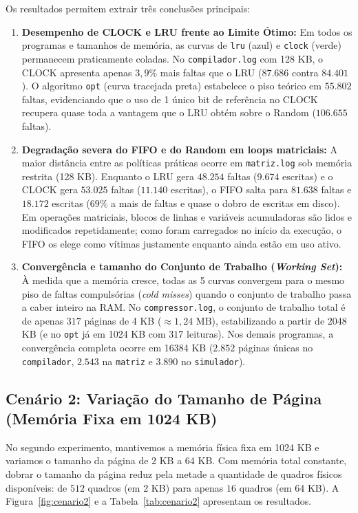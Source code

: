\documentclass[12pt,a4paper]{article}
\begin{document}
Os resultados permitem extrair três conclusões principais:
\begin{enumerate}
    \item \textbf{Desempenho de CLOCK e LRU frente ao Limite Ótimo:} Em todos os programas e tamanhos de memória, as curvas de \texttt{lru} (azul) e \texttt{clock} (verde) permanecem praticamente coladas. No \texttt{compilador.log} com 128 KB, o CLOCK apresenta apenas $3,9\%$ mais faltas que o LRU ($87.686$ contra $84.401$). O algoritmo \texttt{opt} (curva tracejada preta) estabelece o piso teórico em $55.802$ faltas, evidenciando que o uso de 1 único bit de referência no CLOCK recupera quase toda a vantagem que o LRU obtém sobre o Random ($106.655$ faltas).
    \item \textbf{Degradação severa do FIFO e do Random em loops matriciais:} A maior distância entre as políticas práticas ocorre em \texttt{matriz.log} sob memória restrita (128 KB). Enquanto o LRU gera $48.254$ faltas ($9.674$ escritas) e o CLOCK gera $53.025$ faltas ($11.140$ escritas), o FIFO salta para $81.638$ faltas e $18.172$ escritas ($69\%$ a mais de faltas e quase o dobro de escritas em disco). Em operações matriciais, blocos de linhas e variáveis acumuladoras são lidos e modificados repetidamente; como foram carregados no início da execução, o FIFO os elege como vítimas justamente enquanto ainda estão em uso ativo.
    \item \textbf{Convergência e tamanho do Conjunto de Trabalho (\textit{Working Set}):} À medida que a memória cresce, todas as 5 curvas convergem para o mesmo piso de faltas compulsórias (\textit{cold misses}) quando o conjunto de trabalho passa a caber inteiro na RAM. No \texttt{compressor.log}, o conjunto de trabalho total é de apenas $317$ páginas de 4 KB ($\approx 1,24\text{ MB}$), estabilizando a partir de 2048 KB (e no \texttt{opt} já em 1024 KB com $317$ leituras). Nos demais programas, a convergência completa ocorre em 16384 KB ($2.852$ páginas únicas no \texttt{compilador}, $2.543$ na \texttt{matriz} e $3.890$ no \texttt{simulador}).
\end{enumerate}

\subsection{Cenário 2: Variação do Tamanho de Página (Memória Fixa em 1024 KB)}

No segundo experimento, mantivemos a memória física fixa em 1024 KB e variamos o tamanho da página de 2 KB a 64 KB. Com memória total constante, dobrar o tamanho da página reduz pela metade a quantidade de quadros físicos disponíveis: de $512$ quadros (em 2 KB) para apenas $16$ quadros (em 64 KB). A Figura~\ref{fig:cenario2} e a Tabela~\ref{tab:cenario2} apresentam os resultados.
\end{document}

